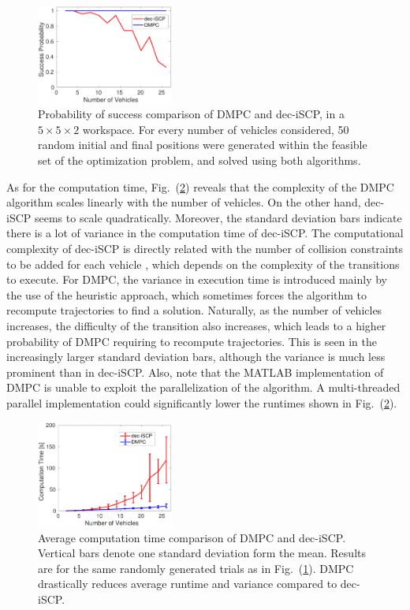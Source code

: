 \begin{figure}[t]
	\centering
	\includegraphics[width=0.4\textwidth]{figures/comp_prob}
	\caption{Probability of success comparison of DMPC and dec-iSCP, in a $5 \times 5 \times 2$ workspace. For every number of vehicles considered, 50 random initial and final positions were generated within the feasible set of the optimization problem, and solved using both algorithms.}
	\label{fig:comp_prob}
\end{figure}

As for the computation time, Fig.~(\ref{fig:comp_time}) reveals that the complexity of the DMPC algorithm scales linearly with the number of vehicles. On the other hand, dec-iSCP seems to scale quadratically. Moreover, the standard deviation bars indicate there is a lot of variance in the computation time of dec-iSCP. The computational complexity of dec-iSCP is directly related with the number of collision constraints to be added for each vehicle \cite{chen2015decoupled}, which depends on the complexity of the transitions to execute. For DMPC, the variance in execution time is introduced mainly by the use of the heuristic approach, which sometimes forces the algorithm to recompute trajectories to find a solution. Naturally, as the number of vehicles increases, the difficulty of the transition also increases, which leads to a higher probability of DMPC requiring to recompute trajectories. This is seen in the increasingly larger standard deviation bars, although the variance is much less prominent than in dec-iSCP. Also, note that the MATLAB implementation of DMPC is unable to exploit the parallelization of the algorithm. A multi-threaded parallel implementation could significantly lower the runtimes shown in Fig.~(\ref{fig:comp_time}).


\begin{figure}[t]
	\centering
	\includegraphics[width=0.4\textwidth]{figures/comp_time}
	\caption{Average computation time comparison of DMPC and dec-iSCP. Vertical bars denote one standard deviation form the mean. Results are for the same randomly generated trials as in Fig.~(\ref{fig:comp_prob}). DMPC drastically reduces average runtime and variance compared to dec-iSCP.}
	\label{fig:comp_time}
\end{figure}